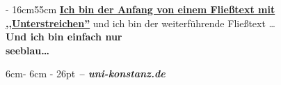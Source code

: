 \documentclass[rgb]{article}
\begin{document}
%
%




\begin{textfeld}[10cm]{\paperwidth - 16cm}{55cm}%
%
%
\underline{\textbf{Ich bin der Anfang von einem Fließtext mit ,,Unterstreichen''}} und ich bin der weiterführende Fließtext \ldots\\[5cm]
%
%
\textcolor{seeblau100}{\textbf{Und ich bin einfach nur\\seeblau\ldots}}%
\end{textfeld}%




%
%   
%
%
%



%
%
\begin{textfeld}{6cm}{\paperheight - 6cm - 26pt}%
\textcolor{seeblau100}{\textbf{\textit{-- uni-konstanz.de}}}%
\end{textfeld}%
\end{document}
